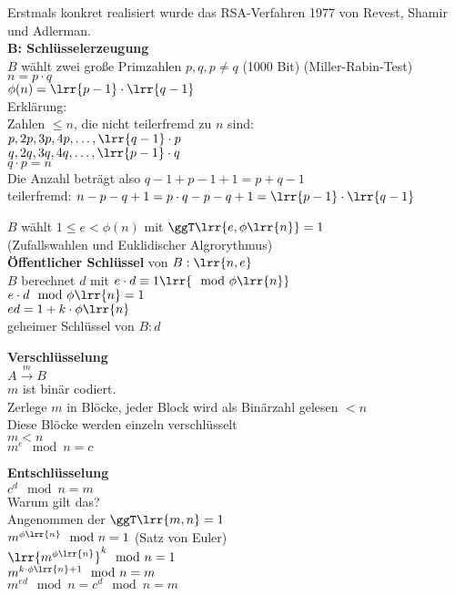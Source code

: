 	Erstmals konkret realisiert wurde das RSA-Verfahren 1977 von Revest, Shamir und Adlerman.\\
	\textbf{B: Schlüsselerzeugung}\\
	$B$ wählt zwei große Primzahlen $p,q,p\neq q$ (1000 Bit)
	(Miller-Rabin-Test)\\
	$n=p\cdot q$\\
	$\phi(n)=\lrr{p-1}\cdot\lrr{q-1}$\\
	Erklärung:\\
	Zahlen $\leq n$, die nicht teilerfremd zu $n$ sind:\\
	$p,2p,3p,4p,\dots,\lrr{q-1}\cdot p$\\
	$q,2q,3q,4q,\dots,\lrr{p-1}\cdot q$\\
	$q\cdot p = n$\\
	Die Anzahl beträgt also $q-1+p-1+1 = p+q-1$\\
	teilerfremd:
	$n-p-q+1=p\cdot q-p-q+1=\lrr{p-1}\cdot\lrr{q-1}$
	
	$B$ wählt $1\leq e<\phi(n)$ mit $\ggT\lrr{e,\phi\lrr{n}}=1$\\
	(Zufallswahlen und Euklidischer Algrorythmus)\\
	\textbf{Öffentlicher Schlüssel} von $B:\lrr{n,e}$\\
	$B$ berechnet $d$ mit $e\cdot d\equiv 1\lrr{\mod\phi\lrr{n}}$\\
	$e\cdot d\mod\phi\lrr{n}=1$\\
	$ed=1+k\cdot\phi\lrr{n}$\\
	geheimer Schlüssel von $B:d$
	
	\textbf{Verschlüsselung}\\
	$A\overset{m}{\rightarrow}B$\\
	$m$ ist binär codiert.\\
	Zerlege $m$ in Blöcke, jeder Block wird als Binärzahl gelesen $<n$\\
	Diese Blöcke werden einzeln verschlüsselt\\
	$m<n$\\
	$m^e\mod n=c$
	
	\textbf{Entschlüsselung}\\
	$c^d\mod n = m$\\
	Warum gilt das?\\
	Angenommen der $\ggT\lrr{m,n}=1$\\
	$m^{\phi\lrr{n}}\mod n=1$ (Satz von Euler)\\
	$\lrr{m^{\phi\lrr{n}}}^k\mod n = 1$\\
	$m^{k\cdot\phi\lrr{n}+1}\mod n = m$\\
	$m^{ed}\mod n = c^d\mod n=m$
	
